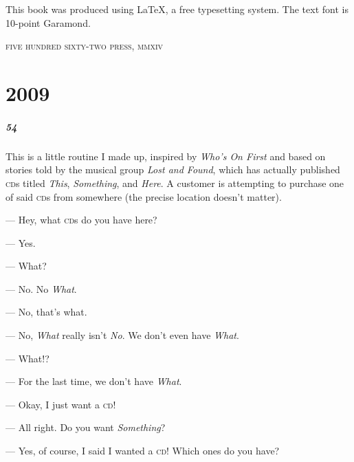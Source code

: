 \documentclass[10pt]{memoir}
\begin{document}
  \noindent This book was produced using \LaTeX, a free typesetting system. The text font is 10-point Garamond.

  \vfill
\begin{center}
  {\scshape
    five hundred sixty-two press, mmxiv\\
  }
\end{center}

\clearpage

{

  \pagestyle{empty}
  \tableofcontents*
  \thispagestyle{empty} %
  \clearpage
}

\pagestyle{ankibook}
\openany
{} %


\chapter{2009}
\paragraph{54} This is a little routine I made up, inspired by \emph{Who's On First} and based on stories told by the musical group \emph{Lost and Found}, which has actually published \textsc{cd}s titled \emph{This}, \emph{Something}, and \emph{Here}. A customer is attempting to purchase one of said \textsc{cd}s from somewhere (the precise location doesn't matter).
\bigskip

--- Hey, what \textsc{cd}s do you have here?

--- Yes.

--- What?

--- No. No \emph{What}.

--- No, that's what.

--- No, \emph{What} really isn't \emph{No}. We don't even have \emph{What}.

--- What!?

--- For the last time, we don't have \emph{What}.

--- Okay, I just want a \textsc{cd}!

--- All right. Do you want \emph{Something}?

--- Yes, of course, I said I wanted a \textsc{cd}! Which ones do you have?
\end{document}
